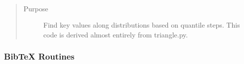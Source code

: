 \documentclass[letterpaper,10pt,english]{sphinxmanual}
\begin{document}

\begin{fulllineitems}
\label{api:splat_model.distributionStats}~\begin{quote}\begin{description}
\item[{Purpose}] \leavevmode
Find key values along distributions based on quantile steps.
This code is derived almost entirely from triangle.py.

\end{description}\end{quote}

\end{fulllineitems}



\subsubsection{BibTeX Routines}
\label{api:bibtex-routines}
\end{document}
